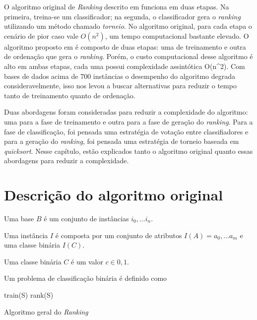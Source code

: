 O algoritmo original de \emph{Ranking} descrito em \cite{langford} funciona em duas etapas. Na primeira, treina-se um classificador;
na segunda, o classificador gera o \emph{ranking} utilizando um método chamado \emph{torneio}. No algoritmo original, para cada etapa
o cenário de pior caso vale $O(n^2)$, um tempo computacional bastante elevado.
O algoritmo proposto em \cite{langford08} é composto de duas etapas: uma de treinamento e outra de ordenação que gera o \emph{ranking}. Porém, o custo computacional desse algoritmo é alto em ambas etapas, cada uma possui complexidade assintótica O(n^2). Com bases de dados acima de $700$ instâncias o desempenho do algoritmo degrada consideravelmente, isso nos levou a buscar alternativas para reduzir o tempo tanto de treinamento quanto de ordenação.

Duas abordagens foram consideradas para reduzir a complexidade do algoritmo: uma para a fase de treinamento e outra para a fase de geração do \emph{ranking}. Para a fase de classificação, foi pensada uma estratégia de votação entre classifiadores e para a geração do \emph{ranking}, foi pensada uma estratégia de torneio baseada em \emph{quicksort}. Nesse capítulo, estão explicados tanto o algoritmo original quanto essas abordagens para reduzir a complexidade.

\section{Descrição do algoritmo original}

\begin{definition}
Uma base $B$ é um conjunto de instâncias ${i_0, \dots i_n}$.
\end{definition}

\begin{definition}
Uma instância $I$ é composta por um conjunto de atributos $I(A) = {a_0, \dots a_m}$ e uma classe binária $I(C)$.
\end{definition}

\begin{definition}
Uma classe binária $C$ é um valor $c \in {0, 1}$.
\end{definition}

\begin{definition}
Um problema de classificação binária é definido como
\end{definition}

\begin{algorithm}
\begin{algorithmic}

\STATE train(S)
\STATE rank(S)

\caption{Algoritmo geral do \emph{Ranking}}
\label{alg_ranking}

\end{algorithmic}
\end{algorithm}

